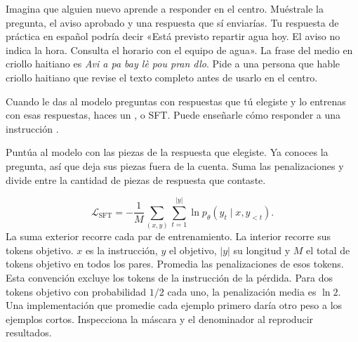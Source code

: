 {Imagina que alguien nuevo aprende a responder en el centro. Muéstrale la pregunta, el aviso aprobado y una respuesta que sí enviarías. Tu respuesta de práctica en español podría decir «Está previsto repartir agua hoy. El aviso no indica la hora. Consulta el horario con el equipo de agua». La frase del medio en criollo haitiano es \emph{Avi a pa bay lè pou pran dlo}. Pide a una persona que hable criollo haitiano que revise el texto completo antes de usarlo en el centro.

Cuando le das al modelo preguntas con respuestas que tú elegiste y lo entrenas con esas respuestas, haces un , o SFT. Puede enseñarle cómo responder a una instrucción \citep{instruct,mit}.}

\moremath
{}
{Puntúa al modelo con las piezas de la respuesta que elegiste. Ya conoces la pregunta, así que deja sus piezas fuera de la cuenta. Suma las penalizaciones y divide entre la cantidad de piezas de respuesta que contaste.}

\begin{equation}
 \mathcal L_{\mathrm{SFT}}
 =-\frac{1}{M}\sum_{(x,y)}\sum_{t=1}^{|y|}
       \ln p_\theta(y_t\mid x,y_{<t}).
 \label{eq:sft}
\end{equation}
{La suma exterior recorre cada par de entrenamiento. La interior recorre sus tokens objetivo. \(x\) es la instrucción, \(y\) el objetivo, \(|y|\) su longitud y \(M\) el total de tokens objetivo en todos los pares. Promedia las penalizaciones de esos tokens. Esta convención excluye los tokens de la instrucción de la pérdida. Para dos tokens objetivo con probabilidad \(1/2\) cada uno, la penalización media es \(\ln 2\). Una implementación que promedie cada ejemplo primero daría otro peso a los ejemplos cortos. Inspecciona la máscara y el denominador al reproducir resultados.}

